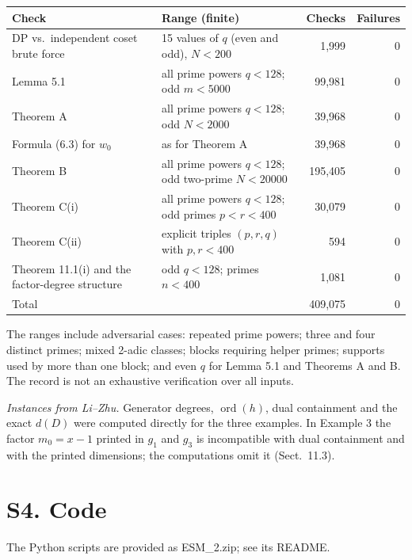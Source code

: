 \documentclass[11pt,a4paper]{article}
\begin{document}
\begin{center}
\small
\begin{tabular}{@{}llrr@{}}
\toprule
Check & Range (finite) & Checks & Failures\\
\midrule
DP vs.\ independent coset brute force & 15 values of $q$ (even and odd), $N<200$ & 1,999 & 0\\
Lemma 5.1 & all prime powers $q<128$; odd $m<5000$ & 99,981 & 0\\
Theorem A & all prime powers $q<128$; odd $N<2000$ & 39,968 & 0\\
Formula (6.3) for $w_0$ & as for Theorem A & 39,968 & 0\\
Theorem B & all prime powers $q<128$; odd two-prime $N<20000$ & 195,405 & 0\\
Theorem C(i) & all prime powers $q<128$; odd primes $p<r<400$ & 30,079 & 0\\
Theorem C(ii) & explicit triples $(p,r,q)$ with $p,r<400$ & 594 & 0\\
Theorem 11.1(i) and the factor-degree structure & odd $q<128$; primes $n<400$ & 1,081 & 0\\
\midrule
Total & & 409,075 & 0\\
\bottomrule
\end{tabular}
\end{center}

The ranges include adversarial cases: repeated prime powers; three and four distinct primes; mixed 2-adic classes; blocks requiring helper primes; supports used by more than one block; and even $q$ for Lemma 5.1 and Theorems A and B. The record is not an exhaustive verification over all inputs.

\emph{Instances from Li--Zhu.} Generator degrees, $\operatorname{ord}(h)$, dual containment and the exact $d(D)$ were computed directly for the three examples. In Example 3 the factor $m_0=x-1$ printed in $g_1$ and $g_3$ is incompatible with dual containment and with the printed dimensions; the computations omit it (Sect.~11.3).

\section*{S4. Code}

The Python scripts are provided as ESM\_2.zip; see its README.
\end{document}
